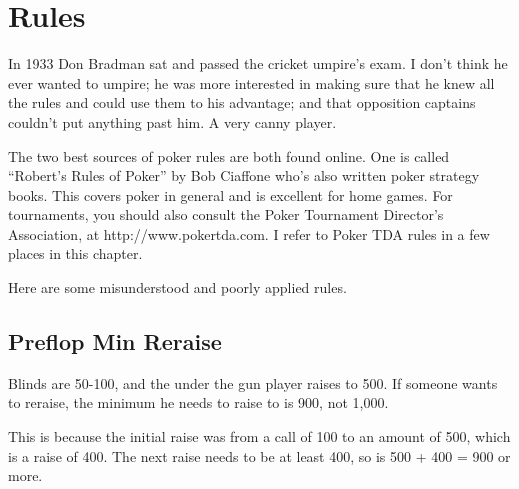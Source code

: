 \chapter{Rules}


In 1933 Don Bradman sat and passed the cricket umpire's exam. I don't
think he ever wanted to umpire; he was more interested in making
sure that he knew all the rules and could use them to his advantage;
and that opposition captains couldn't put anything past him. A very
canny player.

The two best sources of poker rules are both found online.
One is called ``Robert's Rules of Poker'' by Bob Ciaffone
who's also written poker strategy books. This covers
poker in general and is excellent for home games. For tournaments,
you should also consult the Poker Tournament Director's Association,
at http://www.pokertda.com. I refer to Poker TDA rules in a few
places in this chapter.



Here are some misunderstood and poorly applied rules.

\section{Preflop Min Reraise}

Blinds are 50-100, and the under the gun player
raises to 500. If someone wants to reraise, the minimum
he needs to raise to is 900, not 1,000. 

This is because the initial raise was from a call of 100 to an
amount of 500, which is a raise of 400. The next raise needs
to be at least 400, so is 500 + 400 = 900 or more.



